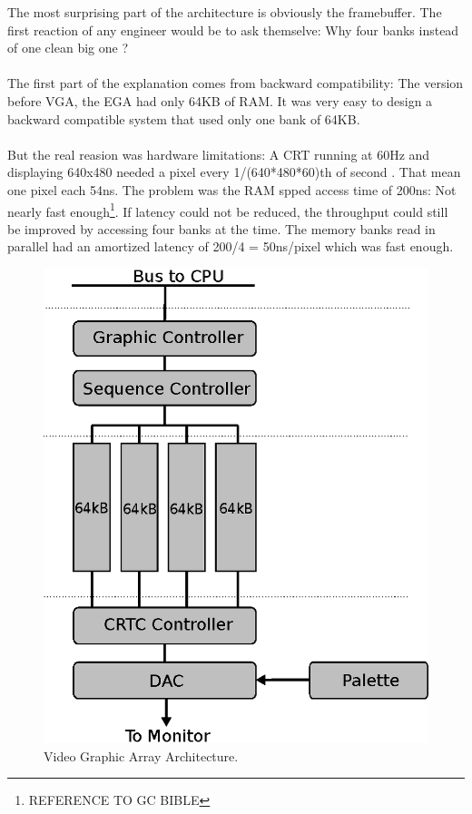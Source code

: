 \documentclass[book.tex]{subfiles}
\begin{document}
The most surprising part of the architecture is obviously the framebuffer. The first reaction of any engineer would be to ask themselve: Why four banks instead of one clean big one ?\\
\\
The first part of the explanation comes from backward compatibility: The version before VGA, the EGA had only 64KB of RAM. It was very easy to design a backward compatible system that used only one bank of 64KB.\\
\\
But the real reasion was hardware limitations: A CRT running at 60Hz and displaying 640x480 needed a pixel every 1/(640*480*60)th of second . That mean one pixel each 54ns. The problem was the RAM spped access time of 200ns: Not nearly fast enough\footnote{REFERENCE TO GC BIBLE}. If latency could not be reduced, the throughput could still be improved by accessing four banks at the time. The memory banks read in parallel had an amortized latency of 200/4 = 50ns/pixel which was fast enough.


\begin{figure}[H]
\centering
\includegraphics[scale=1.2]{imgs/vga.eps}
\caption{Video Graphic Array Architecture.}
\label{fig:vga_arch}
\end{figure}
\end{document}
